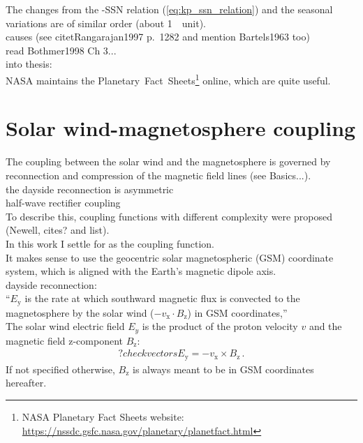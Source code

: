 The changes from the \Kp{}-SSN relation (\ref{eq:kp_ssn_relation}) and the seasonal variations are of similar order (about 1~\Kp{}~unit).\\


causes (see citet{Rangarajan1997} p.~1282 and mention Bartels1963 too)\\
read Bothmer1998 Ch 3...\\


into thesis:\\
NASA maintains the Planetary~Fact~Sheets\footnote{NASA Planetary Fact Sheets website: \url{https://nssdc.gsfc.nasa.gov/planetary/planetfact.html}} online, which are quite useful.\\


\section{Solar wind-magnetosphere coupling}
The coupling between the solar wind and the magnetosphere is governed by reconnection and compression of the magnetic field lines (see Basics...).\\

the dayside reconnection is asymmetric\\
half-wave rectifier coupling\\
To describe this, coupling functions with different complexity were proposed (Newell, cites? and list).\\

In this work I settle for \vBz{} as the coupling function.\\

It makes sense to use the geocentric solar magnetospheric (GSM) coordinate system, which is aligned with the Earth's magnetic dipole axis.\\

dayside reconnection:\\
``$E_\text{y}$ is the rate at which southward magnetic flux is convected to the magnetosphere by the solar wind ($-v_\text{x} \cdot B_\text{z}$) in GSM coordinates,'' \citep{Russell2007}\\

The solar wind electric field $E_y$ is the product of the proton velocity $v$ and the magnetic field z-component $B_\text{z}$:
\begin{align}
	?check vectors  E_\text{y} = -v_\text{x} \times B_\text{z}\,.	\label{eq:coupling_vxB}
\end{align}
If not specified otherwise, $B_\text{z}$ is always meant to be in GSM coordinates hereafter.\\

